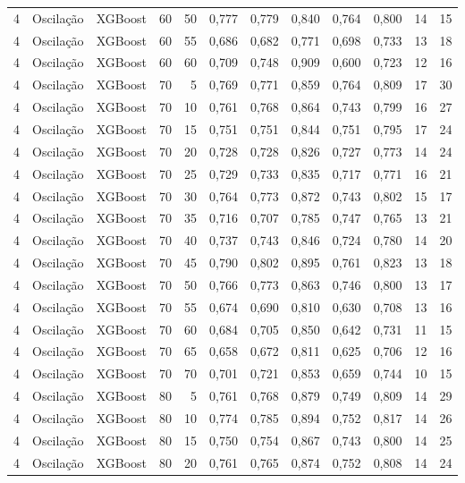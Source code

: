 \begin{longtable}{ccclrrrrrrrr}
4 & Oscilação & XGBoost & 60 & 50 & 0,777 & 0,779 & 0,840 & 0,764 & 0,800 & 14 & 15 \\
4 & Oscilação & XGBoost & 60 & 55 & 0,686 & 0,682 & 0,771 & 0,698 & 0,733 & 13 & 18 \\
4 & Oscilação & XGBoost & 60 & 60 & 0,709 & 0,748 & 0,909 & 0,600 & 0,723 & 12 & 16 \\
4 & Oscilação & XGBoost & 70 & 5 & 0,769 & 0,771 & 0,859 & 0,764 & 0,809 & 17 & 30 \\
4 & Oscilação & XGBoost & 70 & 10 & 0,761 & 0,768 & 0,864 & 0,743 & 0,799 & 16 & 27 \\
4 & Oscilação & XGBoost & 70 & 15 & 0,751 & 0,751 & 0,844 & 0,751 & 0,795 & 17 & 24 \\
4 & Oscilação & XGBoost & 70 & 20 & 0,728 & 0,728 & 0,826 & 0,727 & 0,773 & 14 & 24 \\
4 & Oscilação & XGBoost & 70 & 25 & 0,729 & 0,733 & 0,835 & 0,717 & 0,771 & 16 & 21 \\
4 & Oscilação & XGBoost & 70 & 30 & 0,764 & 0,773 & 0,872 & 0,743 & 0,802 & 15 & 17 \\
4 & Oscilação & XGBoost & 70 & 35 & 0,716 & 0,707 & 0,785 & 0,747 & 0,765 & 13 & 21 \\
4 & Oscilação & XGBoost & 70 & 40 & 0,737 & 0,743 & 0,846 & 0,724 & 0,780 & 14 & 20 \\
4 & Oscilação & XGBoost & 70 & 45 & 0,790 & 0,802 & 0,895 & 0,761 & 0,823 & 13 & 18 \\
4 & Oscilação & XGBoost & 70 & 50 & 0,766 & 0,773 & 0,863 & 0,746 & 0,800 & 13 & 17 \\
4 & Oscilação & XGBoost & 70 & 55 & 0,674 & 0,690 & 0,810 & 0,630 & 0,708 & 13 & 16 \\
4 & Oscilação & XGBoost & 70 & 60 & 0,684 & 0,705 & 0,850 & 0,642 & 0,731 & 11 & 15 \\
4 & Oscilação & XGBoost & 70 & 65 & 0,658 & 0,672 & 0,811 & 0,625 & 0,706 & 12 & 16 \\
4 & Oscilação & XGBoost & 70 & 70 & 0,701 & 0,721 & 0,853 & 0,659 & 0,744 & 10 & 15 \\
4 & Oscilação & XGBoost & 80 & 5 & 0,761 & 0,768 & 0,879 & 0,749 & 0,809 & 14 & 29 \\
4 & Oscilação & XGBoost & 80 & 10 & 0,774 & 0,785 & 0,894 & 0,752 & 0,817 & 14 & 26 \\
4 & Oscilação & XGBoost & 80 & 15 & 0,750 & 0,754 & 0,867 & 0,743 & 0,800 & 14 & 25 \\
4 & Oscilação & XGBoost & 80 & 20 & 0,761 & 0,765 & 0,874 & 0,752 & 0,808 & 14 & 24 \\

\end{longtable}

